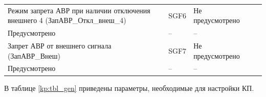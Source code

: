 \begin{longtable}{|>{\centering\arraybackslash}m{5.3cm}|>{\centering\arraybackslash}m{3.3cm}|>{\centering\arraybackslash}m{4.2cm}|>{\centering\arraybackslash}m{1.8cm}|>{\centering\arraybackslash}m{1cm}|}
\hline
\centering Режим запрета АВР при наличии отключения внешнего 4 (ЗапАВР\_Откл\_внеш\_4)  & \centering SGF6 & \centering Не предусмотрено \\ Предусмотрено & \centering -- & \centering \arraybackslash -- \\
\hline
\centering Запрет АВР от внешнего сигнала (ЗапАВР\_Внеш)  & \centering SGF7 & \centering Не предусмотрено \\ Предусмотрено & \centering -- & \centering \arraybackslash -- \\
\hline
\end{longtable}
\normalsize



\par
 В таблице \ref{kp:tbl_gen} приведены параметры, необходимые для настройки КП.

